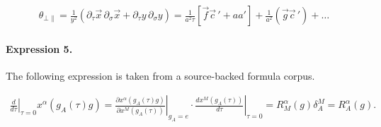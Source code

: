 \documentclass[11pt]{article}
\begin{document}
\begin{align*}\theta _{\bot \parallel }=\frac{1}{y^{2}}\left( \partial _{\tau }\vec{x}\, \partial _{\sigma }\vec{x}+\partial _{\tau }y\, \partial _{\sigma }y\right) =\frac{1}{a^{2}\tau }\left[ \vec{f}{\vec{c}\, }'+aa'\right] +\frac{1}{a^{2}}\left( \vec{g}{\vec{c}\, }'\right) +\ldots\end{align*}

\paragraph{Expression 5.} The following expression is taken from a source-backed formula corpus.

\begin{align*}\left. \frac{d}{d\tau}\right|_{\tau=0} x^{\alpha}(g_{A}(\tau)g)=\left.\frac{\partial x^{\alpha}(g_{A}(\tau)g)}{\partial x^{M}(g_{A}(\tau))}\right|_{g_{A}=e}\cdot\left.\frac{d x^{M}(g_{A}(\tau))}{d \tau}\right|_{\tau=0}=R^{\alpha}_{M}(g)\delta^{M}_{A}=R^{\alpha}_{A}(g).\end{align*}
\end{document}

